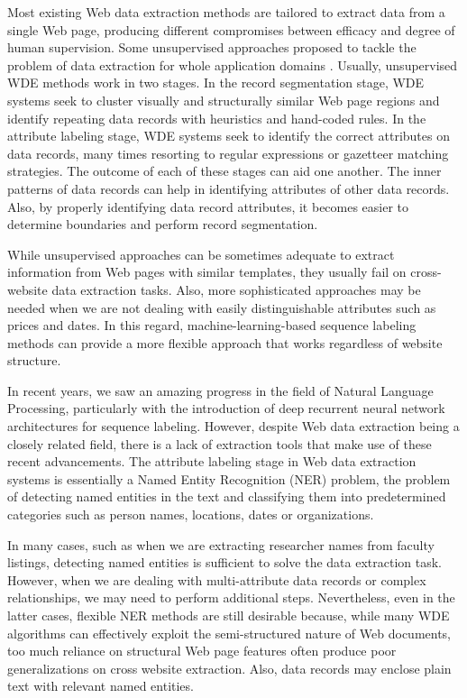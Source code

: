 \documentclass{nle}
\begin{document}
Most existing Web data extraction methods are tailored to extract data 
from a single Web page, producing different compromises between efficacy and 
degree of human supervision. Some unsupervised approaches proposed to tackle 
the problem of data extraction for whole application domains 
\cite{Zhu2005,Zhu2006,Abdessalem2010,Furche2012,Furche2012a}. Usually, 
unsupervised WDE methods work in two stages. In the record segmentation stage,
WDE systems seek to cluster visually and structurally similar Web page regions 
and identify repeating data records with heuristics and 
hand-coded rules. In the attribute labeling stage, WDE systems seek to identify 
the correct attributes on data records, many times resorting to regular expressions 
or gazetteer matching strategies. The outcome of each of these stages can aid one 
another. The inner patterns of data records can help in identifying attributes of other 
data records. Also, by properly identifying data record attributes, it becomes 
easier to determine boundaries and perform record segmentation.

While unsupervised approaches can be sometimes adequate to extract information from 
Web pages with similar templates, they usually fail on cross-website data extraction 
tasks. Also, more sophisticated approaches may be needed when we are not dealing
with easily distinguishable attributes such as prices and dates. In this regard, 
machine-learning-based sequence labeling methods can provide a more flexible 
approach that works regardless of website structure.

In recent years, we saw an amazing progress in the field of Natural Language Processing, 
particularly with the introduction of deep recurrent neural network architectures
for sequence labeling. However, despite Web data extraction being a closely 
related field, there is a lack of extraction tools that make use of these recent 
advancements. The attribute labeling stage in Web data extraction systems
is essentially a Named Entity Recognition (NER) problem, the problem of 
detecting named entities in the text and classifying them into predetermined 
categories such as person names, locations, dates or organizations. 

In many cases, such as when we are extracting researcher names from faculty listings,
detecting named entities is sufficient to solve the data extraction task. However, when we are
dealing with multi-attribute data records or complex relationships, we may need to 
perform additional steps. Nevertheless, even in the latter cases, flexible NER methods 
are still desirable because, while many WDE algorithms can effectively exploit the 
semi-structured nature of Web documents, too much reliance on structural Web page 
features often produce poor generalizations on cross website extraction. Also, 
data records may enclose plain text with relevant named entities. 
\end{document}
